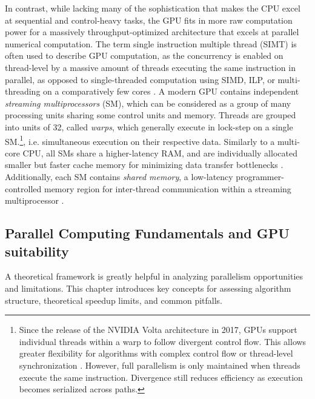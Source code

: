 \documentclass[english,12pt,a4paper,pdftex,sci,utf8]{aaltothesis}
\begin{document}
In contrast, while lacking many of the sophistication that makes the CPU excel at sequential and control-heavy tasks, the GPU fits in more raw computation power for a massively throughput-optimized architecture that excels at parallel numerical computation. The term single instruction multiple thread (SIMT) is often used to describe GPU computation, as the concurrency is enabled on thread-level by a massive amount of threads executing the same instruction in parallel, as opposed to single-threaded computation using SIMD, ILP, or multi-threading on a comparatively few cores \cite{cuda2025guide}. A modern GPU contains independent \emph{streaming multiprocessors} (SM), which can be considered as a group of many processing units sharing some control units and memory. Threads are grouped into units of 32, called \emph{warps}, which generally execute in lock-step on a single SM.\footnote{Since the release of the NVIDIA Volta architecture in 2017, GPUs support individual threads within a warp to follow divergent control flow. This allows greater flexibility for algorithms with complex control flow or thread-level synchronization \cite{cuda2025guide}. However, full parallelism is only maintained when threads execute the same instruction. Divergence still reduces efficiency as execution becomes serialized across paths.}, i.e. simultaneous execution on their respective data. Similarly to a multi-core CPU, all SMs share a higher-latency RAM, and are individually allocated smaller but faster cache memory for minimizing data transfer bottlenecks . Additionally, each SM contains \emph{shared memory}, a low-latency programmer-controlled memory region for inter-thread communication within a streaming multiprocessor \cite{sanders2010cuda, cuda2025guide, kirk2016programming}.

\subsection{Parallel Computing Fundamentals and GPU suitability}\label{subsec:parallell}

A theoretical framework is greatly helpful in analyzing parallelism opportunities and limitations. This chapter introduces key concepts for assessing algorithm structure, theoretical speedup limits, and common pitfalls.
\end{document}
